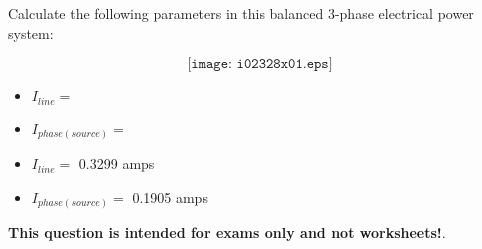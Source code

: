 

Calculate the following parameters in this balanced 3-phase electrical power system:

$$\texttt{[image: i02328x01.eps]}$$

\begin{itemize}
\item{} $I_{line} =$
\vskip 10pt
\item{} $I_{phase(source)} =$
\vskip 10pt
\end{itemize}







\begin{itemize}
\item{} $I_{line} =$ 0.3299 amps
\vskip 10pt
\item{} $I_{phase(source)} =$ 0.1905 amps
\end{itemize}







{\bf This question is intended for exams only and not worksheets!}.




